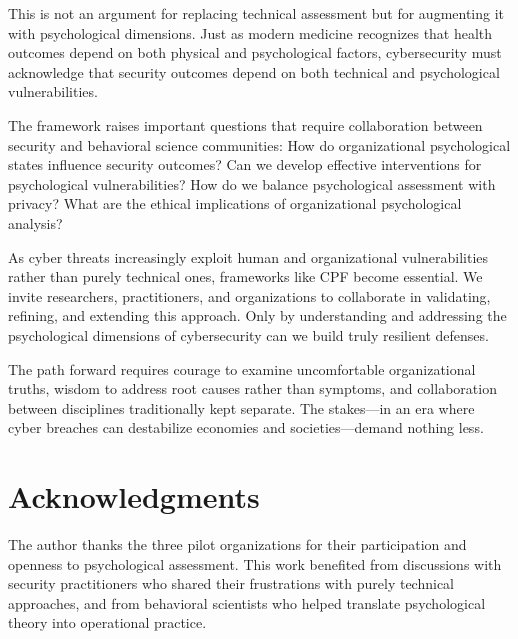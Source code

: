 \documentclass[11pt,a4paper]{article}
\begin{document}
This is not an argument for replacing technical assessment but for augmenting it with psychological dimensions. Just as modern medicine recognizes that health outcomes depend on both physical and psychological factors, cybersecurity must acknowledge that security outcomes depend on both technical and psychological vulnerabilities.

The framework raises important questions that require collaboration between security and behavioral science communities: How do organizational psychological states influence security outcomes? Can we develop effective interventions for psychological vulnerabilities? How do we balance psychological assessment with privacy? What are the ethical implications of organizational psychological analysis?

As cyber threats increasingly exploit human and organizational vulnerabilities rather than purely technical ones, frameworks like CPF become essential. We invite researchers, practitioners, and organizations to collaborate in validating, refining, and extending this approach. Only by understanding and addressing the psychological dimensions of cybersecurity can we build truly resilient defenses.

The path forward requires courage to examine uncomfortable organizational truths, wisdom to address root causes rather than symptoms, and collaboration between disciplines traditionally kept separate. The stakes—in an era where cyber breaches can destabilize economies and societies—demand nothing less.

\section*{Acknowledgments}

The author thanks the three pilot organizations for their participation and openness to psychological assessment. This work benefited from discussions with security practitioners who shared their frustrations with purely technical approaches, and from behavioral scientists who helped translate psychological theory into operational practice.
\end{document}
